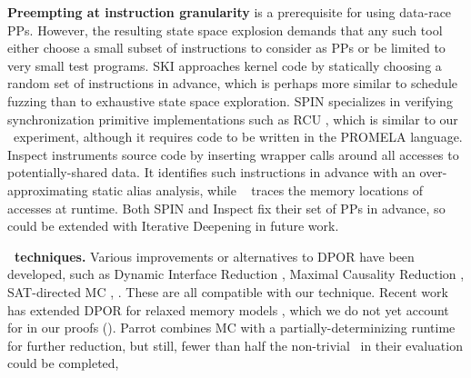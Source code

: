 {\bf Preempting at instruction granularity} is a prerequisite for using data-race PPs.
However, the resulting state space explosion demands that any such tool either
choose a small subset of instructions to consider as PPs
or be limited to very small test programs.
SKI \cite{ski} approaches kernel code by statically choosing a random set of instructions in advance, %
which is perhaps more similar to
schedule fuzzing \cite{randomized-scheduler} than to exhaustive state space exploration.
%
SPIN \cite{spin} specializes in verifying synchronization primitive implementations such as RCU \cite{rcu}, which is similar to our \mxtest~experiment,
although it requires code to be written in the PROMELA language.
%
Inspect \cite{inspect} instruments source code by inserting wrapper calls around all accesses to potentially-shared data.
It identifies such instructions in advance with an over-approximating static alias analysis,
while \landslide~\cite{landslide} traces the memory locations of accesses at runtime.
Both SPIN and Inspect fix their set of PPs in advance, so could be
extended with Iterative Deepening in future work.

{\bf {}~techniques.} Various improvements or alternatives to DPOR have been developed, such as Dynamic Interface Reduction \cite{demeter}, Maximal Causality Reduction \cite{mcr},
SAT-directed MC \cite{satcheck},
.
These are all compatible with our technique.
Recent work \cite{tsopso} has extended DPOR for relaxed memory models \cite{memory-consistency-models},
which we do not yet account for in our proofs (\sect{\ref{sec:soundness}}).
Parrot \cite{parrot} combines MC with a partially-determinizing runtime for further reduction, but still, fewer than half the non-trivial ~in their evaluation could be completed,

